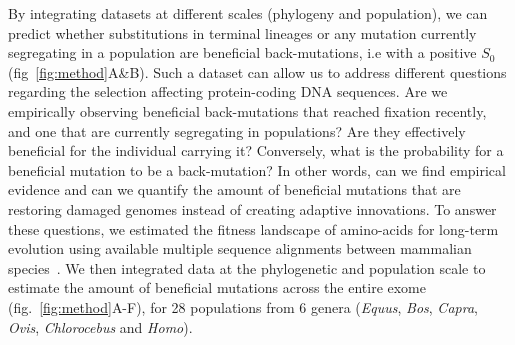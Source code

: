 \documentclass{article}
\newcommand{\Sphy}{S_{0}}
\begin{document}
    By integrating datasets at different scales (phylogeny and population), we can predict whether substitutions in terminal lineages or any mutation currently segregating in a population are beneficial back-mutations, i.e with a positive $\Sphy$ (fig~\ref{fig:method}A\&B).
    Such a dataset can allow us to address different questions regarding the selection affecting protein-coding DNA sequences.
    Are we empirically observing beneficial back-mutations that reached fixation recently, and one that are currently segregating in populations?
    Are they effectively beneficial for the individual carrying it?
    Conversely, what is the probability for a beneficial mutation to be a back-mutation?
    In other words, can we find empirical evidence and can we quantify the amount of beneficial mutations that are restoring damaged genomes instead of creating adaptive innovations.
    To answer these questions, we estimated the fitness landscape of amino-acids for long-term evolution using available multiple sequence alignments between mammalian species~\cite{ranwez_orthomam_2007, howe_ensembl_2021}.
    We then integrated data at the phylogenetic and population scale to estimate the amount of beneficial mutations across the entire exome (fig.~\ref{fig:method}A-F), for 28 populations from 6 genera (\textit{Equus},  \textit{Bos}, \textit{Capra}, \textit{Ovis}, \textit{Chlorocebus} and \textit{Homo}).
\end{document}
